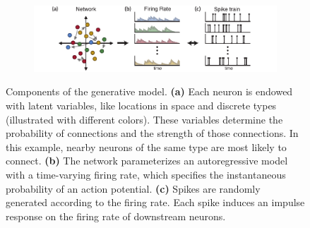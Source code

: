 \begin{figure}[t]
  \centering
  \begin{subfigure}[t]{5.5in}
    \centering
    \includegraphics[width=\textwidth]{figures/ch3/figure1}
  \end{subfigure}
  \caption[Components of the network Hawkes model]{
     Components of the generative model. 
     \textbf{(a)} Each neuron is endowed with latent variables, like 
     locations in space and discrete types (illustrated with different colors).
     These variables determine the probability of connections and the 
     strength of those connections. In this example, nearby neurons of the same 
     type are most likely to connect.
     \textbf{(b)} The network parameterizes an autoregressive model 
     with a time-varying firing rate, which specifies the instantaneous probability 
     of an action potential.
     \textbf{(c)} Spikes are randomly generated according to the 
     firing rate. Each spike induces an impulse response on the firing rate 
     of downstream neurons.}
  \label{fig:fig1}
\end{figure}


